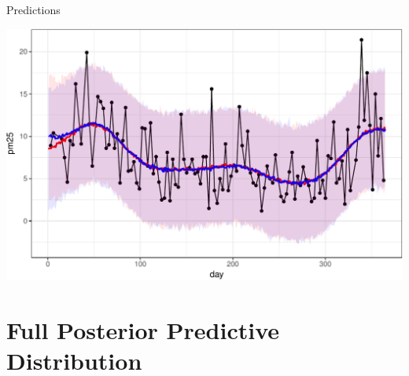 \documentclass[11pt,ignorenonframetext,]{beamer}
\begin{document}
\begin{frame}{%
\protect\hypertarget{predictions}{%
Predictions}}

\begin{center}\includegraphics[width=\textwidth]{Lec13_files/figure-beamer/unnamed-chunk-25-1} \end{center}

\end{frame}

\hypertarget{full-posterior-predictive-distribution}{%
\section{Full Posterior Predictive
Distribution}\label{full-posterior-predictive-distribution}}
\end{document}
